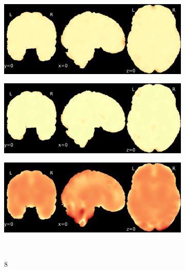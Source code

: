 \documentclass{article}
\begin{document}
\begin{appendices}
\begin{landscape}
\begin{figure}
\begin{subfigure}[t]{0.2\paperheight}
            \end{subfigure}
            \begin{subfigure}[t]{0.2\paperheight}
                \centering
                \includegraphics[width=\textwidth]{figures/sig/10mm/rr_ds002338_sub-xp201_sig.pdf}
            \end{subfigure}
            \begin{subfigure}[t]{0.2\paperheight}
                \centering
                \includegraphics[width=\textwidth]{figures/sig/10mm/rs_ds002338_sub-xp201_sig.pdf}
            \end{subfigure}
            \begin{subfigure}[t]{0.2\paperheight}
                \centering
                \includegraphics[width=\textwidth]{figures/sig/10mm/rr.rs_ds002338_sub-xp201_sig.pdf}
            \end{subfigure} \\
            \begin{subfigure}[b][][c]{0.01\paperwidth} 8 \vspace*{15pt} \end{subfigure}

\end{figure}
\end{landscape}
\end{appendices}
\end{document}
